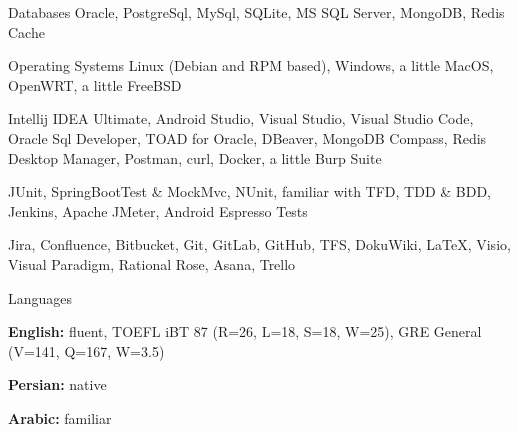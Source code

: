 \begin{cvskills}
\cvskill
  {Databases} %
  {Oracle, PostgreSql, MySql, SQLite, MS SQL Server, MongoDB, Redis Cache} %
  
\cvskill
  {Operating Systems} %
  {Linux (Debian and RPM based), Windows, a little MacOS, OpenWRT, a little FreeBSD} %
  
\cvskill
  {} %
  {Intellij IDEA Ultimate, Android Studio, Visual Studio, Visual Studio Code, Oracle Sql Developer, TOAD for Oracle, DBeaver, MongoDB Compass, Redis Desktop Manager, Postman, curl, Docker, a little Burp Suite} %
  
\cvskill
  {} %
  {JUnit, SpringBootTest \& MockMvc, NUnit, familiar with TFD, TDD \& BDD, Jenkins, Apache JMeter, Android Espresso Tests} %
  
\cvskill
  {} %
  {Jira, Confluence, Bitbucket, Git, GitLab, GitHub, TFS, DokuWiki, LaTeX, Visio, Visual Paradigm, Rational Rose, Asana, Trello} %

\cvskill
  {Languages} %
  { %
    \begin{cvitems} %
      \item {\textbf{English:} fluent, TOEFL iBT 87 (R=26, L=18, S=18, W=25), GRE General (V=141, Q=167, W=3.5)}
      \item {\textbf{Persian:} native}
      \item {\textbf{Arabic:} familiar}
    \end{cvitems}
  }
  
\end{cvskills}
